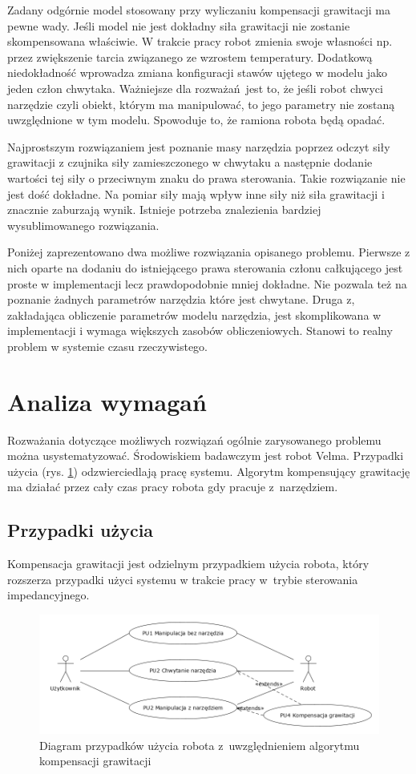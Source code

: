 Zadany odgórnie model stosowany przy wyliczaniu kompensacji grawitacji ma pewne wady. Jeśli model nie jest dokładny siła grawitacji nie zostanie skompensowana właściwie. W trakcie pracy robot zmienia swoje własności np. przez zwiększenie tarcia związanego ze wzrostem temperatury. Dodatkową niedokładność wprowadza zmiana konfiguracji stawów ujętego w modelu jako jeden człon chwytaka.  Ważniejsze dla rozważań jest to, że jeśli robot chwyci narzędzie czyli obiekt, którym ma manipulować, to jego parametry nie zostaną uwzględnione w tym modelu. Spowoduje to, że ramiona robota będą opadać.

Najprostszym rozwiązaniem jest poznanie masy narzędzia poprzez odczyt siły grawitacji z czujnika siły zamieszczonego w chwytaku a następnie dodanie wartości tej siły o przeciwnym znaku do prawa sterowania. Takie rozwiązanie nie jest dość dokładne. Na pomiar siły mają wpływ inne siły niż siła grawitacji i znacznie zaburzają wynik. Istnieje potrzeba znalezienia bardziej wysublimowanego rozwiązania.

Poniżej zaprezentowano dwa możliwe rozwiązania opisanego problemu. Pierwsze z nich oparte na dodaniu do istniejącego prawa sterowania członu całkującego jest proste w implementacji lecz prawdopodobnie mniej dokładne. Nie pozwala też na poznanie żadnych parametrów narzędzia które jest chwytane. Druga z, zakładająca obliczenie parametrów modelu narzędzia, jest skomplikowana w implementacji i wymaga większych zasobów obliczeniowych. Stanowi to realny problem w systemie czasu rzeczywistego. 


\section{Analiza wymagań}
Rozważania dotyczące możliwych rozwiązań ogólnie zarysowanego problemu można usystematyzować. Środowiskiem badawczym jest robot Velma. Przypadki użycia (rys. \ref{fig:usecase}) odzwierciedlają pracę systemu. Algorytm kompensujący grawitację ma działać przez cały czas pracy robota gdy pracuje z~narzędziem. 
\subsection{Przypadki użycia}
Kompensacja grawitacji jest odzielnym przypadkiem  użycia robota, który rozszerza przypadki użyci systemu w trakcie pracy w~trybie sterowania impedancyjnego.

\begin{figure}[H]
	\centering
	\includegraphics[width=.9\textwidth]{images/usecase.png}
	\caption{Diagram przypadków użycia robota z~uwzględnieniem algorytmu kompensacji grawitacji}
	\label{fig:usecase}
\end{figure}


